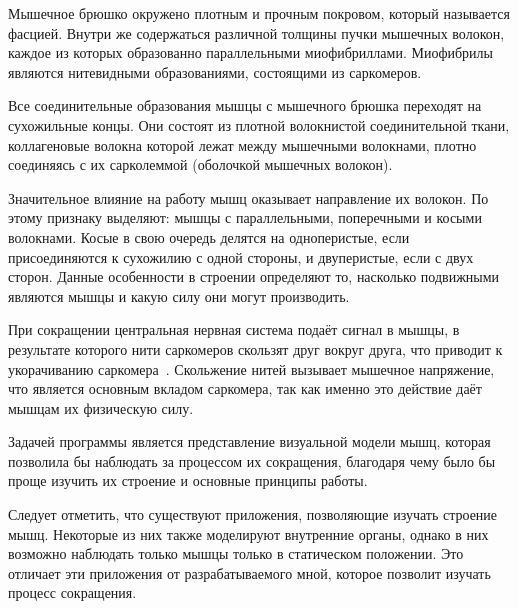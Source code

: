 \par Мышечное брюшко окружено плотным и прочным покровом, который называется фасцией. Внутри же содержаться различной толщины пучки мышечных волокон, каждое из которых образованно параллельными миофибриллами. Миофибрилы являются нитевидными образованиями, состоящими из саркомеров. 
\par Все соединительные образования мышцы с мышечного брюшка переходят на сухожильные концы. Они состоят из плотной волокнистой соединительной ткани, коллагеновые волокна которой лежат между мышечными волокнами, плотно соединяясь с их сарколеммой (оболочкой мышечных волокон).
\par Значительное влияние на работу мышц оказывает направление их волокон. По этому признаку выделяют: мышцы с параллельными, поперечными и косыми волокнами. Косые в свою очередь делятся на одноперистые, если присоединяются к сухожилию с одной стороны, и двуперистые, если с двух сторон. Данные особенности в строении определяют то, насколько подвижными являются мышцы и какую силу они могут производить.
\par При сокращении центральная нервная система подаёт сигнал в мышцы, в результате которого нити саркомеров скользят друг вокруг друга, что приводит к укорачиванию саркомера~\cite{muscle_03}. Скольжение нитей вызывает мышечное напряжение, что является основным вкладом саркомера, так как именно это действие даёт мышцам их физическую силу. 
\par Задачей программы является представление визуальной модели мышц, которая позволила бы наблюдать за процессом их сокращения, благодаря чему было бы проще изучить их строение и основные принципы работы.
\par Следует отметить, что существуют приложения, позволяющие изучать строение мышц. Некоторые из них также моделируют внутренние органы, однако в них возможно наблюдать только мышцы только в статическом положении. Это отличает эти приложения от разрабатываемого мной, которое позволит изучать процесс сокращения.
